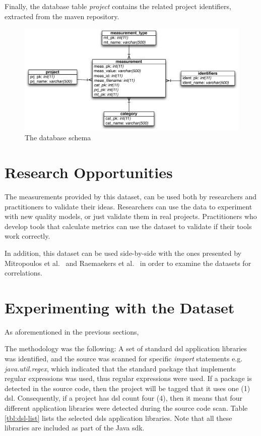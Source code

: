 \documentclass{sig-alternate}
\begin{document}
Finally, the database table \textit{project} contains the related project identifiers, extracted from the maven repository.

\begin{figure}
\centering
\includegraphics[scale=0.6]{database-schema}
\caption{The database schema}
\label{fig:database-schema}
\end{figure}

\section{Research Opportunities}
\label{sec:research-opportunities}

The measurements provided by this dataset, can be used both by researchers and practitioners to validate their ideas. Researchers can use the data to experiment with new quality models, or just validate them in real projects. Practitioners who develop tools that calculate metrics can use the dataset to validate if their tools work correctly.


In addition, this dataset can be used side-by-side with the ones presented by Mitropoulos et al.~\cite{HP04} and Raemaekers et al.~\cite{RDV13} in order to examine the datasets for correlations.

\section{Experimenting with the Dataset}
\label{sec:dsl}

As aforementioned in the previous sections,


The methodology was the following: A set of standard {\sc dsl} application libraries was identified, and the source was scanned for specific \textit{import} statements e.g. \textit{java.util.regex}, which indicated that the standard package that implements regular expressions was used, thus regular expressions were used. If a package is detected in the source code, then the project will be tagged that it uses one (1) {\sc dsl}. Consequently, if a project has {\sc dsl} count four (4), then it means that four different application libraries were detected during the source code scan. Table \ref{tbl:dsl-list} lists the selected {\sc dsl}s application libraries. Note that all these libraries are included as part of the Java {\sc sdk}.
\end{document}
